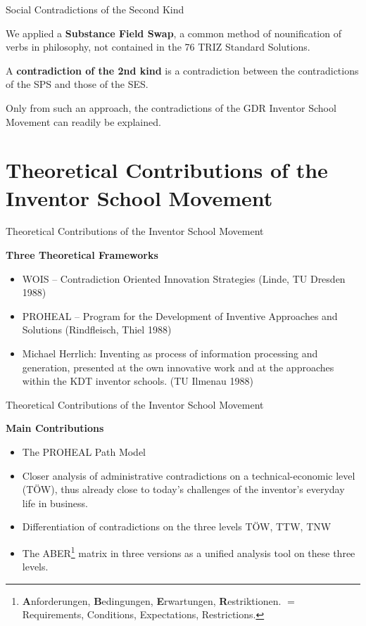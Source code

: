 \documentclass[11pt]{beamer}
\begin{document}
\begin{frame}{Social Contradictions of the Second Kind}

  We applied a \textbf{Substance Field Swap}, a common method of nounification
  of verbs in philosophy, not contained in the 76 TRIZ Standard Solutions. 

A \textbf{contradiction of the 2nd kind} is a contradiction between the
contradictions of the SPS and those of the SES.

Only from such an approach, the contradictions of the GDR Inventor School
Movement can readily be explained. 
\end{frame}

\section{Theoretical Contributions of the Inventor School Movement}
\begin{frame}{Theoretical Contributions of the Inventor School Movement}

\textbf{Three Theoretical Frameworks}
\begin{itemize}
\item WOIS -- Contradiction Oriented Innovation Strategies (Linde, TU Dresden
  1988)
\item PROHEAL -- Program for the Development of Inventive Approaches and
  Solutions (Rindfleisch, Thiel 1988)
\item Michael Herrlich: Inventing as process of information processing and
  generation, presented at the own innovative work and at the approaches
  within the KDT inventor schools. (TU Ilmenau 1988)
\end{itemize}
\end{frame}

\begin{frame}{Theoretical Contributions of the Inventor School Movement}

\textbf{Main Contributions}
\begin{itemize}
\item The PROHEAL Path Model
\item Closer analysis of administrative contradictions on a technical-economic
  level (TÖW), thus already close to today's challenges of the inventor's
  everyday life in business.
\item Differentiation of contradictions on the three levels TÖW, TTW, TNW
\item The ABER\footnote{\textbf{A}nforderungen, \textbf{B}edingungen,
  \textbf{E}rwartungen, \textbf{R}estriktionen. $=$ Requirements, Conditions,
  Expectations, Restrictions.} matrix in three versions as a
  unified analysis tool on these three levels.
\end{itemize}
\end{frame}
\end{document}
